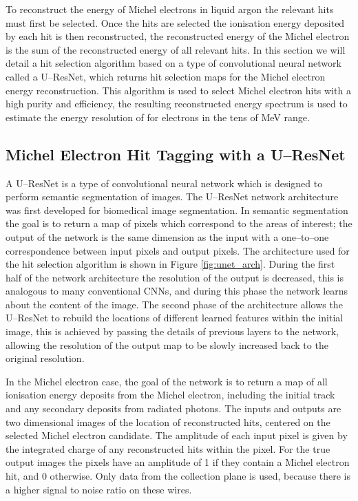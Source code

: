 To reconstruct the energy of Michel electrons in liquid argon the relevant hits
must first be selected. Once the hits are selected the ionisation energy
deposited by each hit is then reconstructed, the reconstructed energy of the 
Michel electron is the sum of the reconstructed energy of all relevant hits. In
this section we will detail a hit selection algorithm based on a type of
convolutional neural network called a U--ResNet, which returns hit selection maps 
for the Michel electron energy reconstruction. This algorithm is used to select 
Michel electron hits with a high purity and efficiency, the resulting 
reconstructed energy spectrum is used to estimate the energy resolution of 
\protodune{} for electrons in the tens of MeV range.

\subsection{Michel Electron Hit Tagging with a U--ResNet}

A U--ResNet is a type of convolutional neural network which is designed to perform
semantic segmentation of images. The U--ResNet network architecture was first 
developed for biomedical image segmentation\cite{ronneberger2015u}. In 
semantic segmentation the goal is to return a map of pixels which correspond 
to the areas of interest; the output of the network is the same dimension as 
the input with a one--to--one correspondence between input pixels and output 
pixels. The architecture used for the hit selection algorithm is shown in 
Figure \ref{fig:unet_arch}. During the first half of the network architecture 
the resolution of the output is decreased, this is analogous to many 
conventional CNNs, and during this phase the network learns about the content 
of the image. The second phase of the architecture allows the U--ResNet to 
rebuild the locations of different learned features within the initial image, 
this is achieved by passing the details of previous layers to the network,
allowing the resolution of the output map to be slowly increased back to the 
original resolution.

In the Michel electron case, the goal of the network is to return a map of all
ionisation energy deposits from the Michel electron, including the initial 
track and any secondary deposits from radiated photons. The inputs and outputs 
are two dimensional images of the location of reconstructed hits, centered on 
the selected Michel electron candidate. The amplitude of each input pixel is 
given by the integrated charge of any reconstructed hits within the pixel. For 
the true output images the pixels have an amplitude of 1 if they contain a 
Michel electron hit, and 0 otherwise. Only data from the collection plane is 
used, because there is a higher signal to noise ratio on these wires. 

